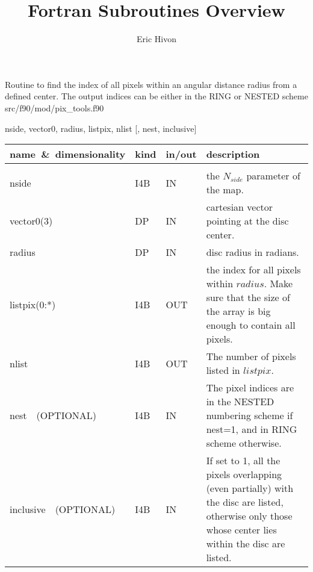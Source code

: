 
\sloppy


\title{\healpix Fortran Subroutines Overview}
 \section[query\_disc]{ }
\label{sub:query_disc}
\author{Eric Hivon}

\begin{facility}
{Routine to find the index of all pixels within an angular distance radius from a defined
center. The output indices can be either in the RING or NESTED scheme} 
{src/f90/mod/pix\_tools.f90}
\end{facility}

\begin{f90format}
{nside, vector0, radius, listpix, nlist [, nest, inclusive]}
\end{f90format}

\begin{arguments}
{
\begin{tabular}{p{0.28\hsize} p{0.05\hsize} p{0.1\hsize} p{0.47\hsize}} \hline 
\textbf{name~\&~dimensionality} & \textbf{kind} & \textbf{in/out} & \textbf{description} \\ \hline
                   &   &   &                           \\ %
nside & I4B & IN & the $N_{side}$ parameter of the map. \\
vector0(3) & DP & IN & cartesian vector pointing at the disc center. \\
radius & DP & IN & disc radius in radians. \\
listpix(0:*) & I4B & OUT & the index for all pixels within $radius$. Make sure that the size of the array is big enough to contain all pixels. \\ 
nlist & I4B & OUT & The number of pixels listed in $listpix$. \\
nest\ \ (OPTIONAL) & I4B & IN &  The pixel indices are in the NESTED numbering
                   scheme if nest=1, and in RING scheme otherwise. \\
inclusive\ \ (OPTIONAL) & I4B & IN & If set to 1, all the pixels overlapping
                   (even partially)
                   with the disc are listed, otherwise only those whose
                   center lies within the disc are listed. \\

\end{tabular}
}
\end{arguments}


